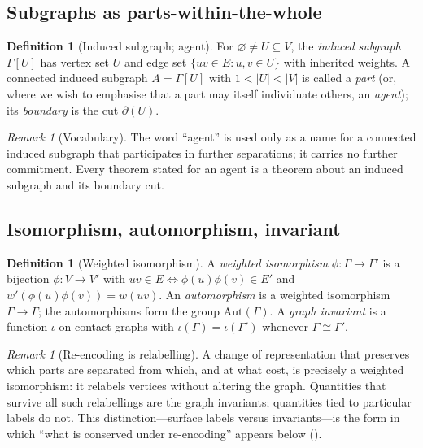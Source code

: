 \documentclass[11pt,a4paper]{article}
\theoremstyle{thmstyle}
\theoremstyle{definition}
\newtheorem{definition}[theorem]{Definition}
\theoremstyle{remark}
\newtheorem{remark}[theorem]{Remark}
\newcommand{\Gph}{\Gamma}                 %
\newcommand{\V}{V}                        %
\newcommand{\E}{E}                        %
\newcommand{\wt}{w}                       %
\newcommand{\cut}{\partial}               %
\newcommand{\Agent}{A}                    %
\newcommand{\abs}[1]{\lvert#1\rvert}
\begin{document}
\subsection{Subgraphs as parts-within-the-whole}

\begin{definition}[Induced subgraph; agent]
\label{def:subgraph}
For $\varnothing\neq U\subseteq\V$, the \emph{induced subgraph} $\Gph[U]$ has
vertex set $U$ and edge set $\{uv\in\E : u,v\in U\}$ with inherited weights. A
connected induced subgraph $\Agent=\Gph[U]$ with $1<\abs{U}<\abs{\V}$ is called a
\emph{part} (or, where we wish to emphasise that a part may itself individuate
others, an \emph{agent}); its \emph{boundary} is the cut $\cut(U)$.
\end{definition}

\begin{remark}[Vocabulary]
\label{rem:agent-word}
The word ``agent'' is used only as a name for a connected induced subgraph that
participates in further separations; it carries no further commitment. Every
theorem stated for an agent is a theorem about an induced subgraph and its
boundary cut.
\end{remark}

\subsection{Isomorphism, automorphism, invariant}

\begin{definition}[Weighted isomorphism]
\label{def:iso}
A \emph{weighted isomorphism} $\phi\colon\Gph\to\Gph'$ is a bijection
$\phi\colon\V\to\V'$ with $uv\in\E\iff\phi(u)\phi(v)\in\E'$ and
$\wt'(\phi(u)\phi(v))=\wt(uv)$. An \emph{automorphism} is a weighted isomorphism
$\Gph\to\Gph$; the automorphisms form the group $\mathrm{Aut}(\Gph)$. A
\emph{graph invariant} is a function $\iota$ on contact graphs with
$\iota(\Gph)=\iota(\Gph')$ whenever $\Gph\cong\Gph'$.
\end{definition}

\begin{remark}[Re-encoding is relabelling]
\label{rem:reencode}
A change of representation that preserves which parts are separated from which,
and at what cost, is precisely a weighted isomorphism: it relabels vertices
without altering the graph. Quantities that survive all such relabellings are
the graph invariants; quantities tied to particular labels do not. This
distinction---surface labels versus invariants---is the form in which
``what is conserved under re-encoding'' appears below ().
\end{remark}
\end{document}

